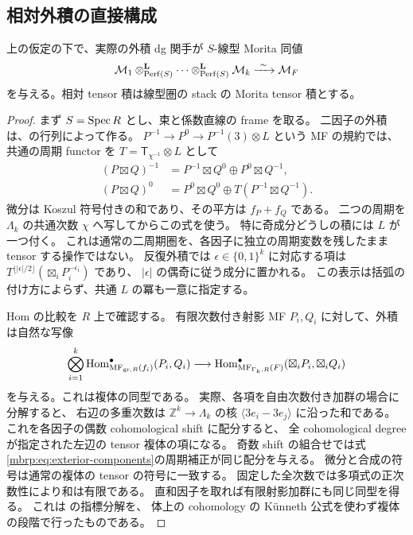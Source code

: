 \subsection{相対外積の直接構成}

\begin{lemma}[共通係数直線を持つ相対外積]
\label{mbrp:lem:relative-ts}
上の仮定の下で、実際の外積 dg 関手が $S$-線型 Morita 同値
\begin{equation}\label{mbrp:eq:relative-ts}
 \mathcal M_1\otimes^{\mathbf L}_{\operatorname{Perf}(S)}\cdots
       \otimes^{\mathbf L}_{\operatorname{Perf}(S)}\mathcal M_k
       \xrightarrow{\ \sim\ }\mathcal M_F
\end{equation}
を与える。相対 tensor 積は線型圏の stack の Morita tensor 積とする。
\end{lemma}
\begin{proof}
まず $S=\operatorname{Spec} R$ とし、束と係数直線の frame を取る。
二因子の外積は、\cite[Definition~3.51]{NFBFKKernels}の行列によって作る。
$P^{-1}\to P^0\to P^{-1}(3)\otimes L$ という MF の規約では、
共通の周期 functor を $T=\mathsf T_{\chi^{-1}}\otimes L$ として
\begin{align}
 (P\boxtimes Q)^{-1}
   &=P^{-1}\boxtimes Q^0\oplus P^0\boxtimes Q^{-1},\\
 (P\boxtimes Q)^0
   &=P^0\boxtimes Q^0\oplus T(P^{-1}\boxtimes Q^{-1}).
 \label{mbrp:eq:exterior-components}
\end{align}
微分は Koszul 符号付きの和であり、その平方は $f_P+f_Q$ である。
二つの周期を $\Lambda_k$ の共通次数 $\chi$ へ写してからこの式を使う。
特に奇成分どうしの積には $L$ が一つ付く。
これは通常の二周期圏を、各因子に独立の周期変数を残したまま tensor する操作ではない。
反復外積では $\epsilon\in\{0,1\}^k$ に対応する項は
$T^{\lfloor|\epsilon|/2\rfloor}(\boxtimes_iP_i^{-\epsilon_i})$ であり、
$|\epsilon|$ の偶奇に従う成分に置かれる。
この表示は括弧の付け方によらず、共通 $L$ の冪も一意に指定する。

Hom の比較を $R$ 上で確認する。
有限次数付き射影 MF $P_i,Q_i$ に対して、外積は自然な写像
\begin{equation}\label{mbrp:eq:relative-hom}
 \bigotimes_{i=1}^k
    \operatorname{Hom}^\bullet_{\operatorname{MF}_{\mathrm{gr},R}(f_i)}(P_i,Q_i)
 \longrightarrow
 \operatorname{Hom}^\bullet_{\operatorname{MF}_{\Gamma_k,R}(F)}
       (\boxtimes_iP_i,\boxtimes_iQ_i)
\end{equation}
を与える。これは複体の同型である。
実際、各項を自由次数付き加群の場合に分解すると、
右辺の多重次数は $\mathbb Z^k\to\Lambda_k$ の核
$\langle3e_i-3e_j\rangle$ に沿った和である。
これを各因子の偶数 cohomological shift に配分すると、
全 cohomological degree が指定された左辺の tensor 複体の項になる。
奇数 shift の組合せでは式\eqref{mbrp:eq:exterior-components}の周期補正が同じ配分を与える。
微分と合成の符号は通常の複体の tensor の符号に一致する。
固定した全次数では多項式の正次数性により和は有限である。
直和因子を取れば有限射影加群にも同じ同型を得る。
これは \cite[Lemma~3.52の証明]{NFBFKKernels}の指標分解を、
体上の cohomology の K\"unneth 公式を使わず複体の段階で行ったものである。


\end{proof}
